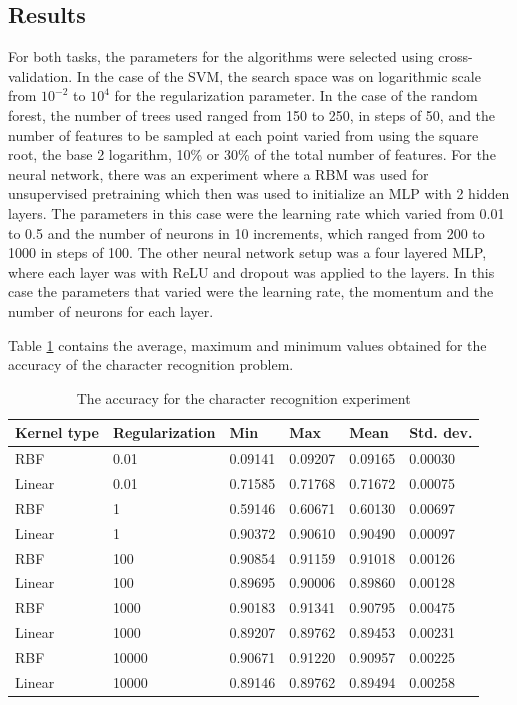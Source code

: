 \subsection{Results}
\label{sec:recog}
For both tasks, the parameters for the algorithms were selected using cross-validation. In the case of the SVM, the search space was on logarithmic scale from $10^{-2}$ to $10^4$ for the regularization parameter. In the case of the random forest, the number of trees used ranged from 150 to 250, in steps of 50, and the number of features to be sampled at each point varied from using the square root, the base 2 logarithm, 10\% or 30\% of the total number of features. For the neural network, there was an experiment where a RBM was used for unsupervised pretraining which then was used to initialize an MLP with 2 hidden layers. The parameters in this case were the learning rate which varied from 0.01 to 0.5 and the number of neurons in 10 increments, which ranged from 200 to 1000 in steps of 100. The other neural network setup was a four layered MLP, where each layer was with ReLU and dropout was applied to the layers. In this case the parameters that varied were the learning rate, the momentum and the number of neurons for each layer. 

Table \ref{table:recog_values} contains the average, maximum and minimum values obtained for the accuracy of the character recognition problem.

\begin{table}[h]
\caption{The accuracy for the character recognition experiment}
\label{table:recog_values}
\begin{tabular}{llllll}
\hline
Kernel type & Regularization & Min     & Max     & Mean    & Std. dev. \\ \hline
RBF & 0.01 & 0.09141 & 0.09207 & 0.09165 & 0.00030 \\ 
Linear & 0.01 & 0.71585 & 0.71768 & 0.71672 & 0.00075 \\ 
RBF & 1 & 0.59146 & 0.60671 & 0.60130 & 0.00697 \\ 
Linear & 1 & 0.90372 & 0.90610 & 0.90490 & 0.00097 \\ 
RBF & 100 & 0.90854 & 0.91159 & 0.91018 & 0.00126 \\ 
Linear & 100 & 0.89695 & 0.90006 & 0.89860 & 0.00128 \\ 
RBF & 1000 & 0.90183 & 0.91341 & 0.90795 & 0.00475 \\ 
Linear & 1000 & 0.89207 & 0.89762 & 0.89453 & 0.00231 \\ 
RBF & 10000 & 0.90671 & 0.91220 & 0.90957 & 0.00225 \\ 
Linear & 10000 & 0.89146 & 0.89762 & 0.89494 & 0.00258 \\ \hline
\end{tabular}
\end{table}

